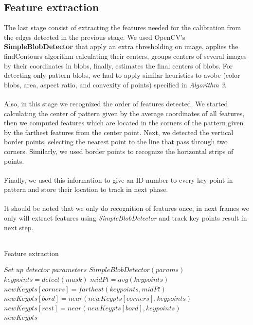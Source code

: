 \documentclass[journal]{IEEEtran}
\begin{document}
\subsection{Feature extraction}
The last stage consist of extracting the features needed for the calibration from the edges detected in the previous stage. We used OpenCV's \textbf{SimpleBlobDetector} that apply an extra thresholding on image, applies the findContours algorithm calculating their centers, groups centers of several images by their coordinates in blobs, finally, estimates the final centers of blobs. For detecting only pattern blobs, we had to apply similar heuristics to avobe (color blobs, area, aspect ratio, and convexity of points) specified in \textit{Algorithm 3}.
\\
\\
Also, in this stage we recognized the order of features detected. We started calculating the center of pattern given by the average coordinates of all features, then we computed features which are located in the corners of the pattern given by the farthest features from the center point. Next, we detected the vertical border points, selecting the nearest point to the line that pass through two corners. Similarly, we used border points to recognize the horizontal strips of points.
\\
\\ 
Finally, we used this information to give an ID number to every key point in pattern and store their location to track in next phase.
\\
\\
It should be noted that we only do recognition of features once, in next frames we only will extract features using \textit{SimpleBlobDetector} and track key points result in next step.
\\
\\
\begin{algorithm}
\caption{Feature extraction}
\begin{algorithmic}[1]
\State $\textit{Set up detector parameters}$
\State $\textit{SimpleBlobDetector}(params)$
\State $keypoints   = \textit{detect}(mask)$ 
\State $midPt   = \textit{avg}(keypoints)$
\State $newKeypts[corners] = farthest(keypoints, midPt)$
\State $newKeypts[bord] = near(newKeypts[corners], keypoints)$
\State $newKeypts[rest] = near(newKeypts[bord], keypoints)$\\
\Return $newKeypts$
\end{algorithmic}
\end{algorithm}
\end{document}
